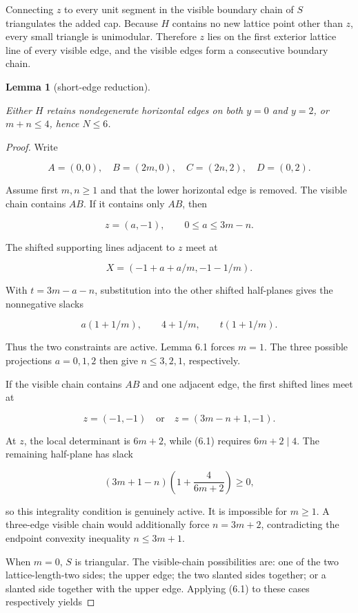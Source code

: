 \documentclass[11pt]{article}
\newtheorem{lemma}[theorem]{Lemma}
\theoremstyle{remark}
\numberwithin{equation}{section}
\begin{document}
Connecting $z$ to every unit segment in the visible boundary chain of $S$ triangulates the added cap. Because $H$ contains no new lattice point other than $z$, every small triangle is unimodular. Therefore $z$ lies on the first exterior lattice line of every visible edge, and the visible edges form a consecutive boundary chain.

\begin{lemma}[short-edge reduction]\label{lem:short-edge}

Either $H$ retains nondegenerate horizontal edges on both $y=0$ and $y=2$, or $m+n\le4$, hence $N\le6$.

\end{lemma}

\begin{proof}

Write

\[
A=(0,0),\quad B=(2m,0),\quad C=(2n,2),\quad D=(0,2).
\]

Assume first $m,n\ge1$ and that the lower horizontal edge is removed. The visible chain contains $AB$. If it contains only $AB$, then

\[
z=(a,-1),\qquad0\leq a\leq3m-n.
\]

The shifted supporting lines adjacent to $z$ meet at

\[
X=(-1+a+a/m,-1-1/m).
\]

With $t=3m-a-n$, substitution into the other shifted half-planes gives the nonnegative slacks

\[
a(1+1/m),\qquad4+1/m,\qquad t(1+1/m).
\]

Thus the two constraints are active. Lemma 6.1 forces $m=1$. The three possible projections $a=0,1,2$ then give $n\le3,2,1$, respectively.

If the visible chain contains $AB$ and one adjacent edge, the first shifted lines meet at

\[
z=(-1,-1)\quad\text{or}\quad z=(3m-n+1,-1).
\]

At $z$, the local determinant is $6m+2$, while (6.1) requires $6m+2\mid4$. The remaining half-plane has slack

\[
(3m+1-n)\left(1+\frac4{6m+2}\right)\geq0,
\]

so this integrality condition is genuinely active. It is impossible for $m\ge1$. A three-edge visible chain would additionally force $n=3m+2$, contradicting the endpoint convexity inequality $n\le3m+1$.

When $m=0$, $S$ is triangular. The visible-chain possibilities are: one of the two lattice-length-two sides; the upper edge; the two slanted sides together; or a slanted side together with the upper edge. Applying (6.1) to these cases respectively yields


\end{proof}
\end{document}
